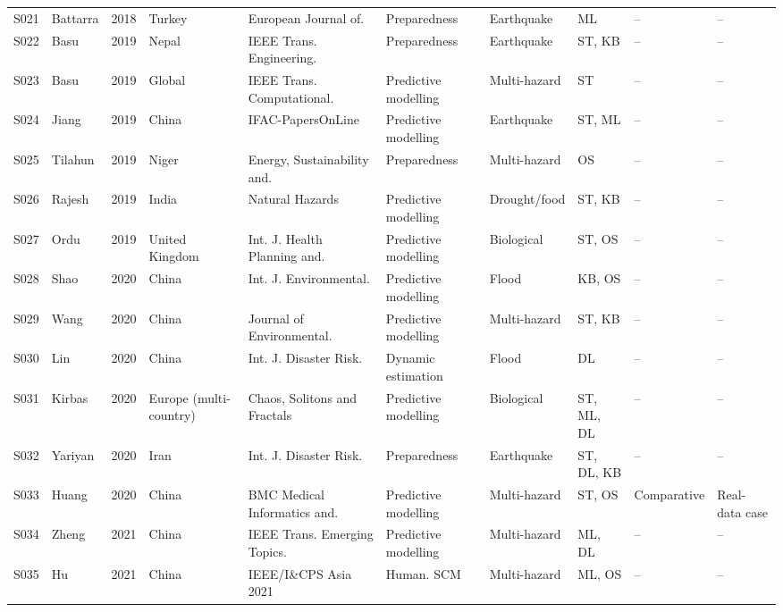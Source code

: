 \begin{landscape}
\begin{longtable}{@{}p{1.0cm}p{3.3cm}p{0.8cm}p{2.3cm}p{3.1cm}p{2.6cm}p{2.2cm}p{1.9cm}p{2.3cm}p{2.2cm}@{}}
S021 & Battarra \cite{Battarra2018DisasterEngineering} & 2018 & Turkey & European Journal of. & Preparedness & Earthquake & ML & -- & -- \\
S022 & Basu \cite{Basu2019ADTN} & 2019 & Nepal & IEEE Trans. Engineering. & Preparedness & Earthquake & ST, KB & -- & -- \\
S023 & Basu \cite{Basu2019ExtractingOperations} & 2019 & Global & IEEE Trans. Computational. & Predictive modelling & Multi-hazard & ST & -- & -- \\
S024 & Jiang \cite{Jiang2019EmergencyEarthquakes} & 2019 & China & IFAC-PapersOnLine & Predictive modelling & Earthquake & ST, ML & -- & -- \\
S025 & Tilahun \cite{Tilahun2019SupplyNiger} & 2019 & Niger & Energy, Sustainability and. & Preparedness & Multi-hazard & OS & -- & -- \\
S026 & Rajesh \cite{Rajesh2019Grey-India} & 2019 & India & Natural Hazards & Predictive modelling & Drought/food & ST, KB & -- & -- \\
S027 & Ordu \cite{Ordu2019AServices} & 2019 & United Kingdom & Int. J. Health Planning and. & Predictive modelling & Biological & ST, OS & -- & -- \\
S028 & Shao \cite{Shao2020ReliefClassification} & 2020 & China & Int. J. Environmental. & Predictive modelling & Flood & KB, OS & -- & -- \\
S029 & Wang \cite{Wang2020EmergencyMethod} & 2020 & China & Journal of Environmental. & Predictive modelling & Multi-hazard & ST, KB & -- & -- \\
S030 & Lin \cite{Lin2020ADisaster} & 2020 & China & Int. J. Disaster Risk. & Dynamic estimation & Flood & DL & -- & -- \\
S031 & Kirbas \cite{Kirbas2020ComparativeApproaches} & 2020 & Europe (multi-country) & Chaos, Solitons and Fractals & Predictive modelling & Biological & ST, ML, DL & -- & -- \\
S032 & Yariyan \cite{Yariyan2020EarthquakeIran} & 2020 & Iran & Int. J. Disaster Risk. & Preparedness & Earthquake & ST, DL, KB & -- & -- \\
S033 & Huang \cite{Huang2020MedicalMethod} & 2020 & China & BMC Medical Informatics and. & Predictive modelling & Multi-hazard & ST, OS & Comparative & Real-data case \\
S034 & Zheng \cite{Zheng2021ReinforcementCare} & 2021 & China & IEEE Trans. Emerging Topics. & Predictive modelling & Multi-hazard & ML, DL & -- & -- \\
S035 & Hu \cite{Hu2021PredictionDisasters} & 2021 & China & IEEE/I\&CPS Asia 2021 & Human. SCM & Multi-hazard & ML, OS & -- & -- \\

\end{longtable}
\end{landscape}
